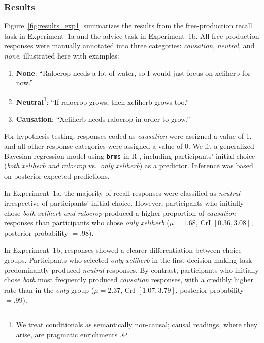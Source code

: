 \documentclass[10pt,letterpaper]{article}
\begin{document}
\subsubsection{Results}

Figure~\ref{fig:results_exp1} summarizes the results from the free-production recall task in Experiment~1a and the advice task in Experiment~1b. All free-production responses were manually annotated into three categories: \textit{causation}, \textit{neutral}, and \textit{none}, illustrated here with examples:

\begin{enumerate}
\item \textbf{None}: ``Ralocrop needs a lot of water, so I would just focus on xeliherb for now.''     
\item \textbf{Neutral}\footnote{We treat conditionals as semantically non-causal; causal readings, where they arise, are pragmatic enrichments \citep[cf.][]{grusdt_probabilistic_2022}.}: ``If ralocrop grows, then xeliherb grows too.''
\item \textbf{Causation}: ``Xeliherb needs ralocrop in order to grow.''
\end{enumerate}

For hypothesis testing, responses coded as \textit{causation} were assigned a value of 1, and all other response categories were assigned a value of 0. We fit a generalized Bayesian regression model using \texttt{brms} \citep{brms} in \textsf{R} \citep{R-core}, including participants’ initial choice (\emph{both} \textit{xeliherb} \textit{and} \textit{ralocrop} vs.\ \emph{only} \textit{xeliherb}) as a predictor. Inference was based on posterior expected predictions.

In Experiment~1a, the majority of recall responses were classified as \textit{neutral} irrespective of participants’ initial choice. However, participants who initially chose \emph{both} \textit{xeliherb} \textit{and} \textit{ralocrop} produced a higher proportion of \textit{causation} responses than participants who chose \emph{only} \textit{xeliherb} ($\mu = 1.68$, CrI $[0.36, 3.08]$, posterior probability $= .98$).

In Experiment~1b, responses showed a clearer differentiation between choice groups. Participants who selected \emph{only} \textit{xeliherb} in the first decision-making task predominantly produced \textit{neutral} responses. By contrast, participants who initially chose \emph{both} most frequently produced \textit{causation} responses, with a credibly higher rate than in the \emph{only} group ($\mu = 2.37$, CrI $[1.07, 3.79]$, posterior probability $= .99$).
\end{document}
